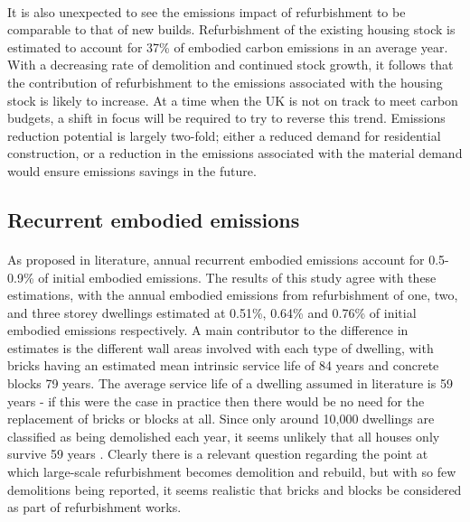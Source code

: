 \documentclass[12pt]{article}
\begin{document}
\paragraph{}
It is also unexpected to see the emissions impact of refurbishment to be comparable to that of new builds. Refurbishment of the existing housing stock is estimated to account for 37\% of embodied carbon emissions in an average year. With a decreasing rate of demolition and continued stock growth, it follows that the contribution of refurbishment to the emissions associated with the housing stock is likely to increase. At a time when the UK is not on track to meet carbon budgets, a shift in focus will be required to try to reverse this trend. Emissions reduction potential is largely two-fold; either a reduced demand for residential construction, or a reduction in the emissions associated with the material demand would ensure emissions savings in the future.

\subsection{Recurrent embodied emissions}

\paragraph{}
As proposed in literature, annual recurrent embodied emissions account for 0.5-0.9\% of initial embodied emissions. The results of this study agree with these estimations, with the annual embodied emissions from refurbishment of one, two, and three storey dwellings estimated at 0.51\%, 0.64\% and 0.76\% of initial embodied emissions respectively. A main contributor to the difference in estimates is the different wall areas involved with each type of dwelling, with bricks having an estimated mean intrinsic service life of 84 years and concrete blocks 79 years. The average service life of a dwelling assumed in literature is 59 years \citep{Dixit2019-bj} - if this were the case in practice then there would be no need for the replacement of bricks or blocks at all. Since only around 10,000 dwellings are classified as being demolished each year, it seems unlikely that all houses only survive 59 years \citep{Ministry_of_Housing_Communities2012-zw}. Clearly there is a relevant question regarding the point at which large-scale refurbishment becomes demolition and rebuild, but with so few demolitions being reported, it seems realistic that bricks and blocks be considered as part of refurbishment works.
\end{document}
